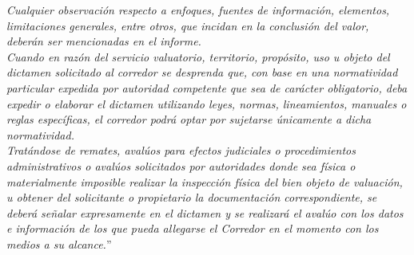 \textit{Cualquier observaci\'on respecto a enfoques, fuentes de informaci\'on, elementos, limitaciones generales, entre otros, que incidan en la conclusi\'on del valor, deber\'an ser mencionadas en el informe.} \\

\textit{Cuando en raz\'on del servicio valuatorio, territorio, prop\'osito, uso u objeto del dictamen solicitado al corredor se desprenda que, con base en una normatividad particular expedida por autoridad competente que sea de car\'acter obligatorio, deba expedir o elaborar el dictamen utilizando leyes, normas, lineamientos, manuales o reglas espec\'ificas, el corredor podr\'a optar por sujetarse \'unicamente a dicha normatividad.} \\

\textit{Trat\'andose de remates, aval\'uos para efectos judiciales o procedimientos administrativos o aval\'uos solicitados por autoridades donde sea f\'isica o materialmente imposible realizar la inspecci\'on f\'isica del bien objeto de valuaci\'on, u obtener del solicitante o propietario la documentaci\'on correspondiente, se deber\'a se\~nalar expresamente en el dictamen y se realizar\'a el aval\'uo con los datos e informaci\'on de los que pueda allegarse el Corredor en el momento con los medios a su alcance.}''\\


